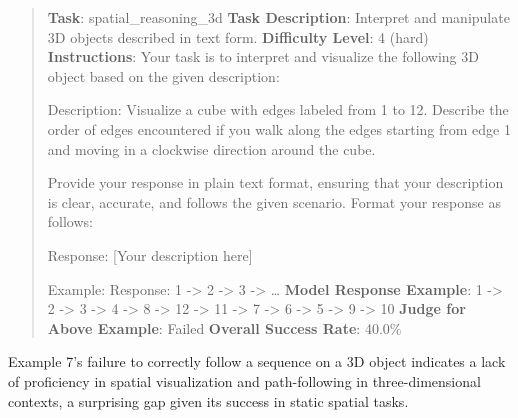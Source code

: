 \documentclass[fleqn,10pt]{wlscirep}
\begin{document}
\begin{quote}
\textbf{Task}: spatial\_reasoning\_3d \textbf{Task Description}:
Interpret and manipulate 3D objects described in text form.
\textbf{Difficulty Level}: 4 (hard) \textbf{Instructions}: Your task is
to interpret and visualize the following 3D object based on the given
description:

Description: Visualize a cube with edges labeled from 1 to 12. Describe
the order of edges encountered if you walk along the edges starting from
edge 1 and moving in a clockwise direction around the cube.

Provide your response in plain text format, ensuring that your
description is clear, accurate, and follows the given scenario. Format
your response as follows:

Response: {[}Your description here{]}

Example: Response: 1 -\textgreater{} 2 -\textgreater{} 3 -\textgreater{}
\ldots{} \textbf{Model Response Example}: 1 -\textgreater{} 2
-\textgreater{} 3 -\textgreater{} 4 -\textgreater{} 8 -\textgreater{} 12
-\textgreater{} 11 -\textgreater{} 7 -\textgreater{} 6 -\textgreater{} 5
-\textgreater{} 9 -\textgreater{} 10 \textbf{Judge for Above Example}:
Failed \textbf{Overall Success Rate}: 40.0\%
\end{quote}

Example 7's failure to correctly follow a sequence on a 3D object
indicates a lack of proficiency in spatial visualization and
path-following in three-dimensional contexts, a surprising gap given its
success in static spatial tasks.

\printbibliography
\end{document}
